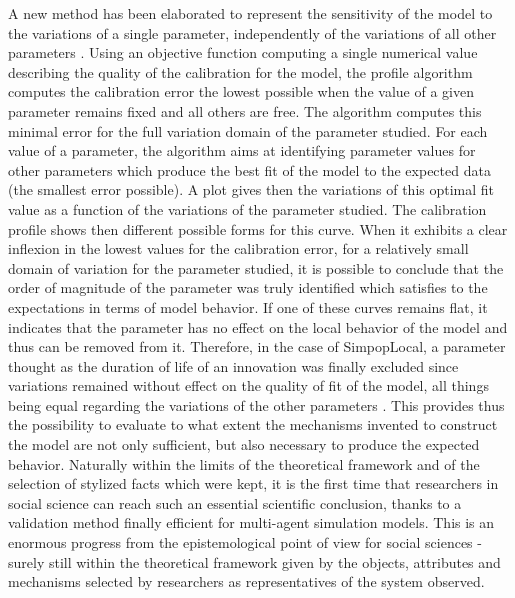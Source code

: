\documentclass[10pt]{article}
\begin{document}
A new method has been elaborated to represent the sensitivity of the model to the variations of a single parameter, independently of the variations of all other parameters \citep{reuillon2015new}. Using an objective function computing a single numerical value describing the quality of the calibration for the model, the profile algorithm computes the calibration error the lowest possible when the value of a given parameter remains fixed and all others are free. The algorithm computes this minimal error for the full variation domain of the parameter studied. For each value of a parameter, the algorithm aims at identifying parameter values for other parameters which produce the best fit of the model to the expected data (the smallest error possible). A plot gives then the variations of this optimal fit value as a function of the variations of the parameter studied. The calibration profile shows then different possible forms for this curve. When it exhibits a clear inflexion in the lowest values for the calibration error, for a relatively small domain of variation for the parameter studied, it is possible to conclude that the order of magnitude of the parameter was truly identified which satisfies to the expectations in terms of model behavior. If one of these curves remains flat, it indicates that the parameter has no effect on the local behavior of the model and thus can be removed from it. Therefore, in the case of SimpopLocal, a parameter thought as the duration of life of an innovation was finally excluded since variations remained without effect on the quality of fit of the model, all things being equal regarding the variations of the other parameters \citep{schmitt2014modelisation}. This provides thus the possibility to evaluate to what extent the mechanisms invented to construct the model are not only sufficient, but also necessary to produce the expected behavior. Naturally within the limits of the theoretical framework and of the selection of stylized facts which were kept, it is the first time that researchers in social science can reach such an essential scientific conclusion, thanks to a validation method finally efficient for multi-agent simulation models. This is an enormous progress from the epistemological point of view for social sciences - surely still within the theoretical framework given by the objects, attributes and mechanisms selected by researchers as representatives of the system observed.
\end{document}
